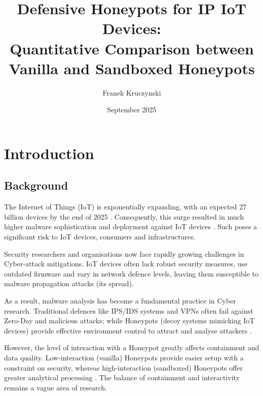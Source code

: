 \documentclass[a4paper,12pt,oneside]{book}			%
\title{\huge\bfseries Defensive Honeypots for IP IoT Devices:\\Quantitative  Comparison between Vanilla and Sandboxed Honeypots}
\author{\LARGE Franek Kruczynski}
\date{September 2025}
\begin{document}
\frontmatter			%
\maketitle				%
\setcounter{page}{1}		%
\pagestyle{fancy}

\tableofcontents 			%

\mainmatter 			%
\clearpage			




\chapter{Introduction}\label{ch:intro}		%
\section{Background}\label{sec:background}	%

The Internet of Things (IoT) is exponentially expanding, with an expected 27 billion devices by the end of 2025 \textit{\citep{autobits2025iot}}. Consequently, this surge resulted in much higher malware sophistication and deployment against IoT devices \textit{\citep{cornell-malware-analysis}}. Such poses a significant risk to IoT devices, consumers and infrastructures.

Security researchers and organisations now face rapidly growing challenges in Cyber-attack mitigations. IoT devices often lack robust security measures, use outdated firmware \textit{\citep{security-issue-inIoT}} and vary in network defence levels, leaving them susceptible to malware propagation attacks (its spread).

As a result, malware analysis has become a fundamental practice in Cyber research. Traditional defences like IPS/IDS systems and VPNs often fail against Zero-Day and malicious attacks; while Honeypots (decoy systems mimicking IoT devices) provide effective environment control to attract and analyse attackers \textit{\citep{crowdstrike-honeypot}}.

However, the level of interaction with a Honeypot greatly affects containment and data quality. Low-interaction (vanilla) Honeypots provide easier setup with a constraint on security, whereas high-interaction (sandboxed) Honeypots offer greater analytical processing \textit{\citep{Kocaogullar2023honeypots}}. The balance of containment and interactivity remains a vague area of research. 
\end{document}
